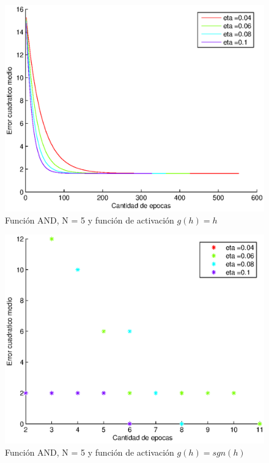 \documentclass{sig-alternate}
\begin{document}
\begin{figure}[!ht]
	\includegraphics[scale=0.5]{images/PuriAnd/AND_N5_err001_lineal__error.eps}
  \caption{Funci\'on AND, N = 5 y funci\'on de activaci\'on $g(h) = h$}
  \label{fig:lineal}
\end{figure}

\begin{figure}[!ht]
	\includegraphics[scale=0.5]{images/PuriAnd/AND_N5_err001_step.eps}
  \caption{Funci\'on AND, N = 5 y funci\'on de activaci\'on $g(h) = sgn(h)$}
  \label{fig:step}
\end{figure}
\end{document}

